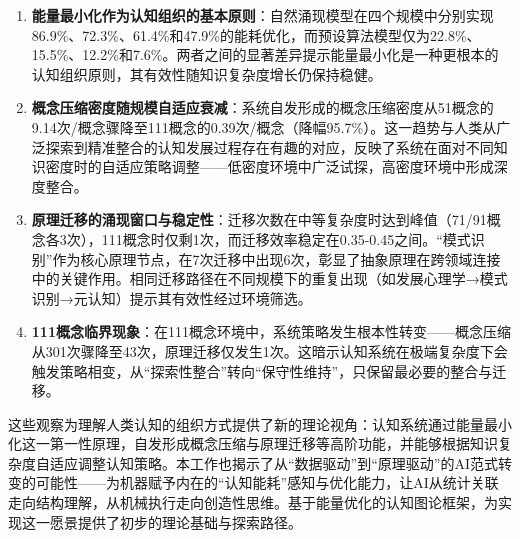 \documentclass[12pt,a4paper]{article}
\begin{document}
\begin{enumerate}
\item \textbf{能量最小化作为认知组织的基本原则}：自然涌现模型在四个规模中分别实现86.9\%、72.3\%、61.4\%和47.9\%的能耗优化，而预设算法模型仅为22.8\%、15.5\%、12.2\%和7.6\%。两者之间的显著差异提示能量最小化是一种更根本的认知组织原则，其有效性随知识复杂度增长仍保持稳健。

\item \textbf{概念压缩密度随规模自适应衰减}：系统自发形成的概念压缩密度从51概念的9.14次/概念骤降至111概念的0.39次/概念（降幅95.7\%）。这一趋势与人类从广泛探索到精准整合的认知发展过程存在有趣的对应，反映了系统在面对不同知识密度时的自适应策略调整——低密度环境中广泛试探，高密度环境中形成深度整合。

\item \textbf{原理迁移的涌现窗口与稳定性}：迁移次数在中等复杂度时达到峰值（71/91概念各3次），111概念时仅剩1次，而迁移效率稳定在0.35-0.45之间。“模式识别”作为核心原理节点，在7次迁移中出现6次，彰显了抽象原理在跨领域连接中的关键作用。相同迁移路径在不同规模下的重复出现（如发展心理学→模式识别→元认知）提示其有效性经过环境筛选。

\item \textbf{111概念临界现象}：在111概念环境中，系统策略发生根本性转变——概念压缩从301次骤降至43次，原理迁移仅发生1次。这暗示认知系统在极端复杂度下会触发策略相变，从“探索性整合”转向“保守性维持”，只保留最必要的整合与迁移。
\end{enumerate}

这些观察为理解人类认知的组织方式提供了新的理论视角：认知系统通过能量最小化这一第一性原理，自发形成概念压缩与原理迁移等高阶功能，并能够根据知识复杂度自适应调整认知策略。本工作也揭示了从“数据驱动”到“原理驱动”的AI范式转变的可能性——为机器赋予内在的“认知能耗”感知与优化能力，让AI从统计关联走向结构理解，从机械执行走向创造性思维。基于能量优化的认知图论框架，为实现这一愿景提供了初步的理论基础与探索路径。

\newpage
\end{document}
